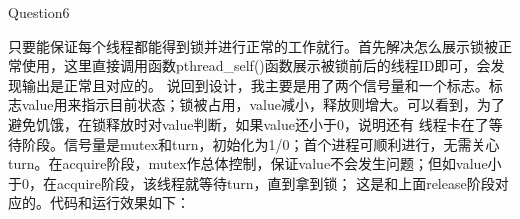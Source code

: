 \documentclass[12pt]{article}
\begin{document}
\begin{figure}[!h]
    \centering
    \hfill
\end{figure}
\newpage
\begin{large}
    \noindent Question6\par
\end{large}
只要能保证每个线程都能得到锁并进行正常的工作就行。首先解决怎么展示锁被正常使用，这里直接调用函数pthread\_self()函数展示被锁前后的线程ID即可，会发现输出是正常且对应的。
说回到设计，我主要是用了两个信号量和一个标志。标志value用来指示目前状态；锁被占用，value减小，释放则增大。可以看到，为了避免饥饿，在锁释放时对value判断，如果value还小于0，说明还有
线程卡在了等待阶段。信号量是mutex和turn，初始化为1/0；首个进程可顺利进行，无需关心turn。在acquire阶段，mutex作总体控制，保证value不会发生问题；但如value小于0，在acquire阶段，该线程就等待turn，直到拿到锁；
这是和上面release阶段对应的。代码和运行效果如下：
\end{document}
